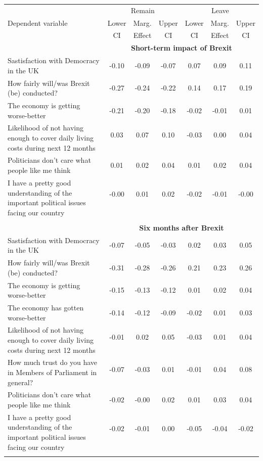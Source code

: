 \documentclass[12pt, letter]{article}
\begin{document}
\footnotesize
\begin{center}
\begin{longtable}{lcccccc}
\toprule[1.5pt]
  & \multicolumn{3}{c}{Remain} & \multicolumn{3}{c}{Leave} \\
  \cmidrule[1pt](lr){2-4} \cmidrule[1pt](lr){5-7}
Dependent variable & Lower  & Marg.  & Upper  & Lower & Marg.  & Upper  \\
 &  CI &  Effect & CI &  CI & Effect & CI \\ 
\toprule[1pt]
& \multicolumn{6}{c}{\textbf{Short-term impact of Brexit}} \\[3pt]


Sastisfaction with Democracy in the UK & -0.10 & -0.09 & -0.07 & 0.07 & 0.09 & 0.11 \\ 
How fairly will/was Brexit (be) conducted? & -0.27 & -0.24 & -0.22 & 0.14 & 0.17 & 0.19 \\[3pt]
The economy is getting worse-better & -0.21 & -0.20 & -0.18 & -0.02 & -0.01 & 0.01 \\[3pt] 
\multirow{2}{200pt}{Likelihood of not having enough to cover daily living costs during next 12 months} & 0.03 & 0.07 & 0.10 & -0.03 & 0.00 & 0.04 \\ 
\\[3pt]
Politicians don't care what people like me think & 0.01 & 0.02 & 0.04 & 0.01 & 0.02 & 0.04 \\[3pt] 
\multirow{2}{200pt}{I have a pretty good understanding of the important political issues facing our country} & -0.00 & 0.01 & 0.02 & -0.02 & -0.01 & -0.00 \\
\\[3pt]
   \\[-7pt]

\toprule[1pt]
& \multicolumn{6}{c}{\textbf{Six months after Brexit}} \\[3pt]
Sastisfaction with Democracy in the UK & -0.07 & -0.05 & -0.03 & 0.02 & 0.03 & 0.05 \\  
How fairly will/was Brexit (be) conducted? & -0.31 & -0.28 & -0.26 & 0.21 & 0.23 & 0.26 \\  
The economy is getting worse-better  & -0.15 & -0.13 & -0.12 & 0.01 & 0.02 & 0.04 \\[3pt] 
The economy has gotten worse-better & -0.14 & -0.12 & -0.09 & -0.02 & 0.01 & 0.03 \\[3pt] 
\multirow{2}{200pt}{Likelihood of not having enough to cover daily living costs during next 12 months} & -0.01 & 0.02 & 0.05 & -0.03 & 0.01 & 0.04 \\
\\[3pt]
\multirow{2}{200pt}{How much trust do you have in Members of Parliament in general?} & -0.07 & -0.03 & 0.01 & -0.01 & 0.04 & 0.08 \\  
\\[3pt]
Politicians don't care what people like me think & -0.02 & -0.00 & 0.02 & 0.01 & 0.03 & 0.04 \\ [3pt] 
\multirow{2}{200pt}{I have a pretty good understanding of the important political issues facing our country} & -0.02 & -0.01 & 0.00 & -0.05 & -0.04 & -0.02 \\ 
\\[3pt]
   \\[-7pt]


\end{longtable}
\end{center}
\end{document}
